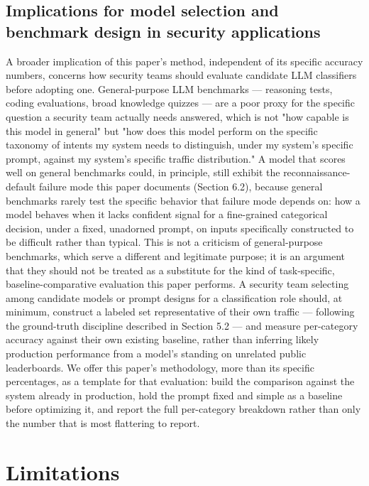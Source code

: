 \documentclass[journal,10pt,twocolumn]{IEEEtran}
\begin{document}
\subsection{Implications for model selection and benchmark design in security applications}

A broader implication of this paper's method, independent of its specific accuracy numbers, concerns how security teams should evaluate candidate LLM classifiers before adopting one. General-purpose LLM benchmarks --- reasoning tests, coding evaluations, broad knowledge quizzes --- are a poor proxy for the specific question a security team actually needs answered, which is not "how capable is this model in general" but "how does this model perform on the specific taxonomy of intents my system needs to distinguish, under my system's specific prompt, against my system's specific traffic distribution." A model that scores well on general benchmarks could, in principle, still exhibit the reconnaissance-default failure mode this paper documents (Section 6.2), because general benchmarks rarely test the specific behavior that failure mode depends on: how a model behaves when it lacks confident signal for a fine-grained categorical decision, under a fixed, unadorned prompt, on inputs specifically constructed to be difficult rather than typical. This is not a criticism of general-purpose benchmarks, which serve a different and legitimate purpose; it is an argument that they should not be treated as a substitute for the kind of task-specific, baseline-comparative evaluation this paper performs. A security team selecting among candidate models or prompt designs for a classification role should, at minimum, construct a labeled set representative of their own traffic --- following the ground-truth discipline described in Section 5.2 --- and measure per-category accuracy against their own existing baseline, rather than inferring likely production performance from a model's standing on unrelated public leaderboards. We offer this paper's methodology, more than its specific percentages, as a template for that evaluation: build the comparison against the system already in production, hold the prompt fixed and simple as a baseline before optimizing it, and report the full per-category breakdown rather than only the number that is most flattering to report.

\section{Limitations}
\end{document}
